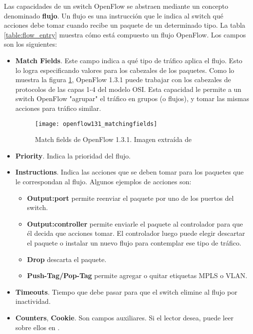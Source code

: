 Las capacidades de un switch OpenFlow se abstraen mediante un concepto denominado \textbf{flujo}. Un flujo es una instrucción que le indica al switch qué acciones debe tomar cuando recibe un paquete de un determinado tipo. La tabla \ref{table:flow_entry} muestra cómo está compuesto un flujo OpenFlow. Los campos son los siguientes:
\begin{itemize}
	\item \textbf{Match Fields}. Este campo indica a qué tipo de tráfico aplica el flujo. Esto lo logra especificando valores para los cabezales de los paquetes. Como lo muestra la figura \ref{fig:openflow_matching_fields}, OpenFlow 1.3.1 puede trabajar con los cabezales de protocolos de las capas 1-4 del modelo OSI. Esta capacidad le permite a un switch OpenFlow "agrupar" el tráfico en grupos (o flujos), y tomar las mismas acciones para tráfico similar.
	
	\begin{figure}[H] 
		\centering    
		\texttt{[image: openflow131\_matchingfields]}
		\caption{Match fields de OpenFlow 1.3.1. Imagen extraída de \cite{proyecto-rrap}}
		\label{fig:openflow_matching_fields}
	\end{figure}

	\item \textbf{Priority}. Indica la prioridad del flujo.
	\item \textbf{Instructions}. Indica las acciones que se deben tomar para los paquetes que le correspondan al flujo. Algunos ejemplos de acciones son:
		\begin{itemize}
			\item \textbf{Output:port} permite reenviar el paquete por uno de los puertos del switch.
			\item \textbf{Output:controller} permite enviarle el paquete al controlador para que él decida que acciones tomar. El controlador luego puede elegir descartar el paquete o instalar un nuevo flujo para contemplar ese tipo de tráfico.
			\item \textbf{Drop} descarta el paquete.
			\item \textbf{Push-Tag/Pop-Tag} permite agregar o quitar etiquetas MPLS o VLAN.
		\end{itemize}
	\item \textbf{Timeouts}. Tiempo que debe pasar para que el switch elimine al flujo por inactividad.
	\item \textbf{Counters}, \textbf{Cookie}. Son campos auxiliares. Si el lector desea, puede leer sobre ellos en \cite{openflow-1.3.1}.
\end{itemize}

